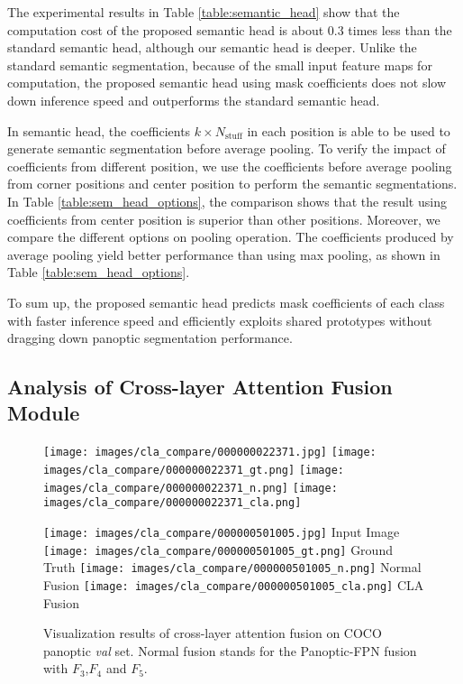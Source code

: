 \documentclass[runningheads]{llncs}
\begin{document}
The experimental results in Table  \ref{table:semantic_head} show that the computation cost of the proposed semantic head is about 0.3 times less than the standard semantic head, although our semantic head is deeper. Unlike the standard semantic segmentation, because of the small input feature maps for computation, the proposed semantic head using mask coefficients does not slow down inference speed and outperforms the standard semantic head.

In semantic head, the coefficients $k\times N_{\text{stuff}}$ in each position is able to be used to generate semantic segmentation before average pooling. To verify the impact of coefficients from different position, we use the coefficients before average pooling from corner positions and center position to perform the semantic segmentations. In Table \ref{table:sem_head_options}, the comparison shows that the result using coefficients from center position is superior than other positions. Moreover, we compare the different options on pooling operation. The coefficients produced by average pooling yield better performance than using max pooling, as shown in Table \ref{table:sem_head_options}.

To sum up, the proposed semantic head predicts mask coefficients of each class with faster inference speed and efficiently exploits shared prototypes without dragging down panoptic segmentation performance. 

\subsection{Analysis of Cross-layer Attention Fusion Module }

\begin{figure}[!t]
  \texttt{[image: images/cla\_compare/000000022371.jpg]}
\endminipage\hfill
{}
  \texttt{[image: images/cla\_compare/000000022371\_gt.png]}
\endminipage\hfill
{}\texttt{[image: images/cla\_compare/000000022371\_n.png]}
\endminipage \hfill
{}\texttt{[image: images/cla\_compare/000000022371\_cla.png]}
\endminipage



    \centering
  \texttt{[image: images/cla\_compare/000000501005.jpg]} 
  Input Image
\endminipage\hfill
{}
    \centering
  \texttt{[image: images/cla\_compare/000000501005\_gt.png]}
  Ground Truth
\endminipage\hfill
{}\centering
  \texttt{[image: images/cla\_compare/000000501005\_n.png]}
  Normal Fusion
\endminipage \hfill
{}\centering
  \texttt{[image: images/cla\_compare/000000501005\_cla.png]}
  CLA Fusion
\endminipage
\caption{Visualization results of cross-layer attention fusion on COCO panoptic \emph{val} set. Normal fusion stands for the Panoptic-FPN  \cite{DeGeus2018a} fusion with $F_3$,$F_4$ and $F_5$. }
\label{fig:cla_fusion_compare}
\end{figure}
\end{document}
